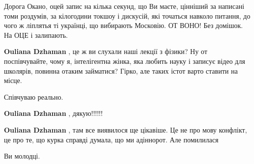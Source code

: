 \begin{itemize}
Дорога Окано, оцей запис на кілька секунд, що Ви маєте, цінніший за написані
томи роздумів, за кілогодини токшоу і дискусій, які точаться навколо питання,
до чого ж ліплятья ті українці, що вибирають Московію. ОТ ВОНО! Без домішок. На
ОЦЕ і залипають.

\begin{itemize}
 
\textbf{Ouliana Dzhaman} , це ж ви слухали наші лекції з фізики? Ну от
поспівчувайте, чому я, інтелігентна жінка, яка любить науку і записує відео для
школярів, повинна отаким займатися? Гірко, але таких істот варто ставити на
місце.

 
Співчуваю реально.

 
\textbf{Ouliana Dzhaman} , дякую!!!!!!

 
\textbf{Ouliana Dzhaman} , там все виявилося ще цікавіше. Це не про мову
конфлікт, це про те, що курка справді думала, що ми адіннорот. Але помилилася
\end{itemize}

 
Ви молодці.

 

\end{itemize}
